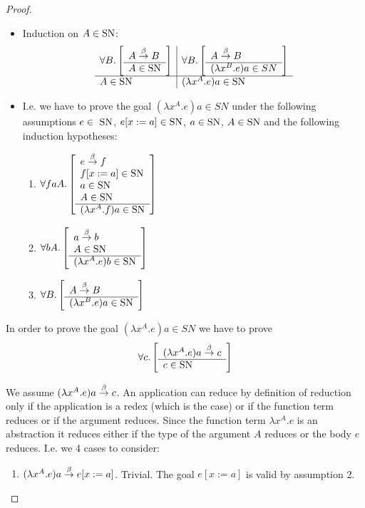 \begin{theorem}
\begin{proof}
\begin{itemize}
        \item Induction on $A \in \text{SN}$:
            $$
            \begin{array}{l|l}
                \forall B. \left[ \begin{array}{l} A \stackrel{\beta}{\to} B \\ \hline A \in \text{SN}\end{array} \right]
                &
                \forall B. \left[ \begin{array}{l} 
                    A \stackrel{\beta}{\to} B
                 \\ \hline (\lambda x^B. e)a \in SN\end{array} \right]
                \\
                \hline
                A \in \text{SN}
                &
                (\lambda x^A.e) a \in \text{SN}
            \end{array}
            $$

        \item I.e. we have to prove the goal $(\lambda x^A.e)a \in SN$ under the
            following assumptions $e \in \SN$, $e[x:=a] \in \text{SN}$, $a \in \text{SN}$,
            $A \in \text{SN}$ and the following induction hypotheses:
            \begin{enumerate}
            \item $\forall faA. \left[ \begin{array}{l} 
                    e \stackrel{\beta}{\to} f
                    \\
                    f[x:=a] \in \text{SN}
                    \\
                    a \in \text{SN}
                    \\
                    A \in \text{SN}
                 \\ \hline (\lambda x^A.f)a \in \text{SN}\end{array} \right]$

            \item $\forall bA. \left[ \begin{array}{l} 
                    a \stackrel{\beta}{\to} b
                    \\
                    A \in \text{SN}
                 \\ \hline (\lambda x^A.e)b \in \text{SN}\end{array} \right]$

            \item $\forall B. \left[ \begin{array}{l} 
                    A \stackrel{\beta}{\to} B
                 \\ \hline (\lambda x^B.e)a \in \text{SN}\end{array} \right]$
            \end{enumerate}
        \end{itemize}

        In order to prove the goal $(\lambda x^A.e)a \in SN$ we have to prove
        $$
        \forall c. \left[ \begin{array}{l} (\lambda x^A.e)a \stackrel{\beta}{\to} c \\ \hline c \in \text{SN}\end{array} \right]
        $$

        We assume $(\lambda x^A.e)a \stackrel{\beta}{\to} c$. An application can reduce by
        definition of reduction only if the application is a redex (which is the
        case) or if the function term reduces or if the argument reduces. Since
        the function term $\lambda x^A.e$ is an abstraction it reduces either if
        the type of the argument $A$ reduces or the body $e$ reduces. I.e. we 4
        cases to consider:
        \begin{enumerate}
        \item $(\lambda x^A.e)a \stackrel{\beta}{\to} e[x:=a]$. Trivial. The goal $e[x:=a]$ is
            valid by assumption 2.


\end{enumerate}
\end{proof}
\end{theorem}
